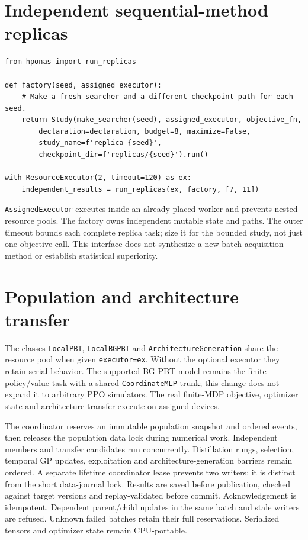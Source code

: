 \section{Independent sequential-method replicas}
\begin{Verbatim}[fontsize=\small]
from hponas import run_replicas

def factory(seed, assigned_executor):
    # Make a fresh searcher and a different checkpoint path for each seed.
    return Study(make_searcher(seed), assigned_executor, objective_fn,
        declaration=declaration, budget=8, maximize=False,
        study_name=f'replica-{seed}',
        checkpoint_dir=f'replicas/{seed}').run()

with ResourceExecutor(2, timeout=120) as ex:
    independent_results = run_replicas(ex, factory, [7, 11])
\end{Verbatim}
\texttt{AssignedExecutor} executes inside an already placed worker and prevents
nested resource pools. The factory owns independent mutable state and paths.
The outer timeout bounds each complete replica task; size it for the bounded
study, not just one objective call. This interface does not synthesize a new
batch acquisition method or establish statistical superiority.

\section{Population and architecture transfer}
The classes \texttt{LocalPBT}, \texttt{LocalBGPBT} and \texttt{ArchitectureGeneration} share the resource pool when given \texttt{executor=ex}.
Without the optional executor they retain serial behavior. The supported
BG-PBT model remains the finite policy/value task with a shared
\texttt{CoordinateMLP} trunk; this change does not expand it to arbitrary PPO
simulators. The real finite-MDP objective, optimizer state and architecture
transfer execute on assigned devices.

The coordinator reserves an immutable population snapshot and ordered events,
then releases the population data lock during numerical work. Independent
members and transfer candidates run concurrently. Distillation rungs,
selection, temporal GP updates, exploitation and architecture-generation
barriers remain ordered. A separate lifetime coordinator lease prevents two
writers; it is distinct from the short data-journal lock. Results are saved
before publication, checked against target versions and replay-validated before
commit. Acknowledgement is idempotent. Dependent parent/child updates in the
same batch and stale writers are refused. Unknown failed batches retain their
full reservations. Serialized tensors and optimizer state remain CPU-portable.

